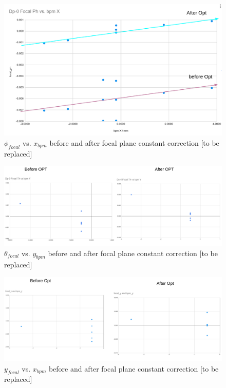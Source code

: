 \begin{figure}
    \centering
    \includegraphics[width =\textwidth]{images/chap4/vdcconstant_focal_bpmx.png}
    \caption{$\phi_{focal}$ vs. $x_{bpm}$ before and after focal plane constant correction [to be replaced]}
    \label{fig:focal_ph_bpm_x_constant_correction_plt}
\end{figure}


\begin{figure}
    \centering
    \includegraphics[width =\textwidth]{images/chap4/vdcconstant_focal_th_bpmy.png}
    \caption{$\theta_{focal}$ vs. $y_{bpm}$ before and after focal plane constant correction [to be replaced]}
    \label{fig:my_label}
\end{figure}

\begin{figure}
    \centering
    \includegraphics[width =\textwidth]{images/chap4/vdcconstant_focaly_bpmy.png}
    \caption{$y_{focal}$ vs. $x_{bpm}$ before and after focal plane constant correction [to be replaced]}
    \label{fig:my_label}
\end{figure}


